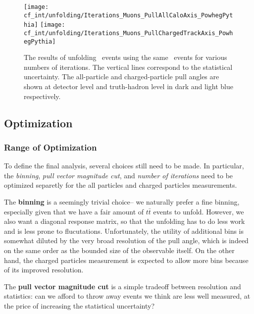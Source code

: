 \begin{figure}[htb]
  \begin{center}
  \texttt{[image: cf\_int/unfolding/Iterations\_Muons\_PullAllCaloAxis\_PowhegPythia]}
  \texttt{[image: cf\_int/unfolding/Iterations\_Muons\_PullChargedTrackAxis\_PowhegPythia]}
  \caption[]{The results of unfolding \PowPythia\ events using the same
    \PowPythia\ events for various numbers of iterations. The vertical lines correspond to the statistical uncertainty.  The all-particle
    and charged-particle pull angles are shown at detector level and truth-hadron
    level in dark and light blue respectively.}
  \label{fig:color:unfolding:simpletest}
  \end{center}
\end{figure}


	\subsection{Optimization}
	\label{chapter:color:unfolding:optimization}

	\subsubsection{Range of Optimization}

	To define the final analysis, several choices still need to be made. In particular, the \textit{binning}, \textit{pull vector magnitude cut}, and \textit{number of iterations} need to be optimized separetly for the all particles and charged particles measurements.

	The \textbf{binning} is a seemingly trivial choice-- we naturally prefer a fine binning, especially given that we have a fair amount of $t\bar{t}$ events to unfold. However, we also want a diagonal response matrix, so that the unfolding has to do less work and is less prone to flucutations. Unfortunately, the utility of additional bins is somewhat diluted by the very broad resolution of the pull angle, which is indeed on the same order as the bounded size of the observable itself. On the other hand, the charged particles measurement is expected to allow more bins because of its improved resolution.

	The \textbf{pull vector magnitude cut} is a simple tradeoff between resolution and statistics: can we afford to throw away events we think are less well measured, at the price of increasing the statistical uncertainty?


